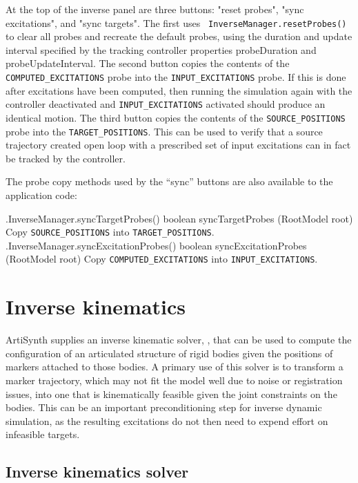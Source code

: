 At the top of the inverse panel are three buttons: {\sf "reset probes"}, {\sf
"sync excitations"}, and {\sf "sync targets"}. The first uses {\tt
InverseManager.resetProbes()} to clear all probes and recreate the default
probes, using the duration and update interval specified by the tracking
controller properties {\sf probeDuration} and {\sf probeUpdateInterval}.  The
second button copies the contents of the {\tt COMPUTED\_EXCITATIONS} probe into
the {\tt INPUT\_EXCITATIONS} probe. If this is done after excitations have been
computed, then running the simulation again with the controller deactivated and
{\tt INPUT\_EXCITATIONS} activated should produce an identical motion.  The
third button copies the contents of the {\tt SOURCE\_POSITIONS} probe into the
{\tt TARGET\_POSITIONS}. This can be used to verify that a source trajectory
created open loop with a prescribed set of input excitations can in fact be
tracked by the controller.

The probe copy methods used by the ``sync'' buttons are also available
to the application code:
%
\begin{methodtable}{0.45}{0.55}
\midline
\methodentry
{\inverse.InverseManager.syncTargetProbes()}%
{boolean syncTargetProbes (RootModel root)}%
{Copy {\tt SOURCE\_POSITIONS} into {\tt TARGET\_POSITIONS}.}%
%
\methodentry
{\inverse.InverseManager.syncExcitationProbes()}%
{boolean syncExcitationProbes (RootModel root)}%
{Copy {\tt COMPUTED\_EXCITATIONS} into {\tt INPUT\_EXCITATIONS}.}%
%
\midline
\end{methodtable}

\section{Inverse kinematics}
\label{InverseKinematics:sec}

ArtiSynth supplies an inverse kinematic solver, ,
that can be used to compute the configuration of an articulated structure of
rigid bodies given the positions of markers attached to those bodies.  A
primary use of this solver is to transform a marker trajectory, which may not
fit the model well due to noise or registration issues, into one that is
kinematically feasible given the joint constraints on the bodies. This can be
an important preconditioning step for inverse dynamic simulation, as the
resulting excitations do not then need to expend effort on infeasible
targets.

\subsection{Inverse kinematics solver}
\label{InverseKinematicsSolver:sec}

